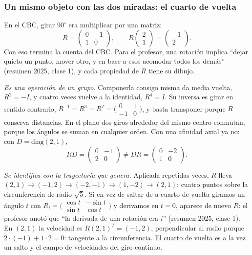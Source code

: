 \subsubsection*{Un mismo objeto con las dos miradas: el cuarto de vuelta}

En el CBC, girar \(90^\circ\) era multiplicar por una matriz:
\[
  R=\begin{pmatrix}0&-1\\1&0\end{pmatrix},\qquad
  R\begin{pmatrix}2\\1\end{pmatrix}=\begin{pmatrix}-1\\2\end{pmatrix}.
\]
Con eso termina la cuenta del CBC. Para el profesor, una rotación implica ``dejar quieto un
punto, mover otro, y en base a esos acomodar todos los demás'' (resumen 2025, clase 1), y
cada propiedad de \(R\) tiene su dibujo.

\emph{Es una operación de un grupo.} Componerla consigo misma da media vuelta,
\(R^2=-I\), y cuatro veces vuelve a la identidad, \(R^4=I\). Su inversa es girar en sentido
contrario, \(R^{-1}=R^3=R^T=\bigl(\begin{smallmatrix}0&1\\-1&0\end{smallmatrix}\bigr)\), y
basta transponer porque \(R\) conserva distancias. En el plano dos giros alrededor del mismo
centro conmutan, porque los ángulos se suman en cualquier orden. Con una afinidad axial ya
no: con \(D=\mathrm{diag}(2,1)\),
\[
  RD=\begin{pmatrix}0&-1\\2&0\end{pmatrix}\neq
  DR=\begin{pmatrix}0&-2\\1&0\end{pmatrix}.
\]

\emph{Se identifica con la trayectoria que genera.} Aplicada repetidas veces, \(R\) lleva
\((2,1)\to(-1,2)\to(-2,-1)\to(1,-2)\to(2,1)\): cuatro puntos sobre la circunferencia de
radio \(\sqrt5\). Si en vez de saltar de a cuarto de vuelta giramos un ángulo \(t\) con
\(R_t=\bigl(\begin{smallmatrix}\cos t&-\sin t\\ \sin t&\cos t\end{smallmatrix}\bigr)\) y
derivamos en \(t=0\), aparece de nuevo \(R\): el profesor anotó que ``la derivada de una
rotación era \(i\)'' (resumen 2025, clase 1). En \((2,1)\) la velocidad es \(R(2,1)^T=(-1,2)\),
perpendicular al radio porque \(2\cdot(-1)+1\cdot2=0\): tangente a la circunferencia. El
cuarto de vuelta es a la vez un salto y el campo de velocidades del giro continuo.

